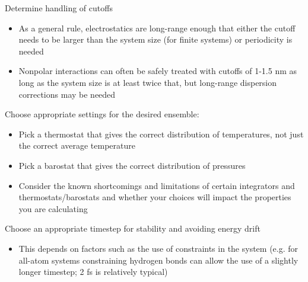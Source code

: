 \documentclass[9pt,bestpractices]{livecoms}
\begin{document}
\begin{Checklists*}[p!]
\begin{checklist}{Determine handling of cutoffs}
\begin{itemize}
\item As a general rule, electrostatics are long-range enough that either the cutoff needs to be larger than the system size (for finite systems) or periodicity is needed
\item Nonpolar interactions can often be safely treated with cutoffs of 1-1.5 nm as long as the system size is at least twice that, but long-range dispersion corrections may be needed
\end{itemize}
\end{checklist}

\begin{checklist}{Choose appropriate settings for the desired ensemble:}
\begin{itemize}
\item Pick a thermostat that gives the correct distribution of temperatures, not just the correct average temperature
\item Pick a barostat that gives the correct distribution of pressures
\item Consider the known shortcomings and limitations of certain integrators and thermostats/barostats and whether your choices will impact the properties you are calculating
\end{itemize}
\end{checklist}


\begin{checklist}{Choose an appropriate timestep for stability and avoiding energy drift}
\begin{itemize}
\item This depends on factors such as the use of constraints in the system (e.g. for all-atom systems constraining hydrogen bonds can allow the use of a slightly longer timestep; 2 fs is relatively typical)
\end{itemize}
\end{checklist}


\end{Checklists*}







\nocite{*}
{}
\end{document}
